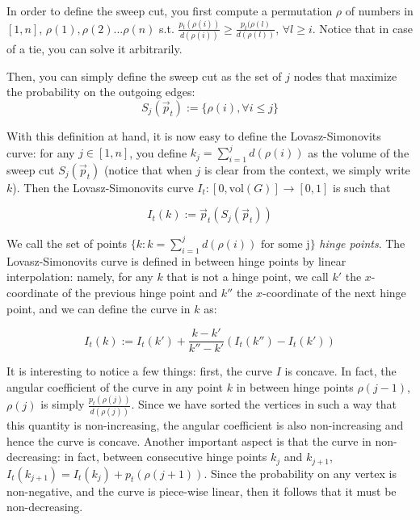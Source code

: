 \documentclass[../main.tex]{subfiles}
\begin{document}
    In order to define the sweep cut, you first compute a permutation $\rho$ of numbers in $[1,n]$, $\rho(1), \rho(2)... \rho(n)$ s.t. $\frac{p_t(\rho(i))}{d(\rho(i))} \geq \frac{p_t(\rho(l)}{d(\rho(l))}$, $\forall l \geq i$. Notice that in case of a tie, you can solve it arbitrarily.
    
    Then, you can simply define the sweep cut as the set of $j$ nodes that maximize the probability on the outgoing edges:  
    \begin{equation}
        S_j(\vec{p}_t) := \{ \rho(i), \forall i\leq j\} 
    \end{equation}
    
    With this definition at hand, it is now easy to define the Lovasz-Simonovits curve: for any $j\in [1,n]$, you define $k_j = \sum_{i=1}^{j} d(\rho(i))$ as the volume of the sweep cut $S_j(\vec{p}_t)$ (notice that when $j$ is clear from the context, we simply write $k$). Then the Lovasz-Simonovits curve $I_t: [0, \text{vol}(G)]\to [0,1]$ is such that
    
    \begin{equation}
        I_t(k) := \vec{p}_t(S_j(\vec{p}_t))
    \end{equation}
    
    We call the set of points $\{k: k = \sum_{i=1}^{j}d(\rho(i)) \text{ for some j}\}$ \textit{hinge points}. The Lovasz-Simonovits curve is defined in between hinge points by linear interpolation: namely, for any $k$ that is not a hinge point, we call $k'$ the $x$-coordinate of the previous hinge point and $k''$ the $x$-coordinate of the next hinge point, and we can define the curve in $k$ as:
    
    \begin{equation}
        I_t(k) := I_t(k') + \frac{k - k'}{k'' - k'} (I_t(k'') - I_t(k'))
    \end{equation}
    
    It is interesting to notice a few things: first, the curve $I$ is concave. In fact, the angular coefficient of the curve in any point $k$ in between hinge points $\rho(j-1)$, $\rho(j)$ is simply $\frac{p_t(\rho(j))}{d(\rho(j))}$. Since we have sorted the vertices in such a way that this quantity is non-increasing, the angular coefficient is also non-increasing and hence the curve is concave. Another important aspect is that the curve in non-decreasing: in fact, between consecutive hinge points $k_j$ and $k_{j+1}$, $I_t(k_{j+1}) = I_t(k_j) + p_t(\rho(j+1))$. Since the probability on any vertex is non-negative, and the curve is piece-wise linear, then it follows that it must be non-decreasing.
    
\end{document}
